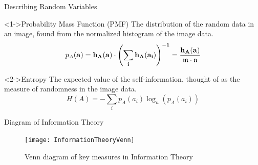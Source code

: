 \documentclass[serif]{beamer}
\begin{document}
\begin{frame}[c]{\sc Describing Random Variables}


\begin{block}<1->{Probability Mass Function (PMF)}
The distribution of the random data in an image, found from the normalized histogram of the image data.
\begin{equation}
\label{PMF}
	p_{A}(\bf{a})=h_{A}(\bf{a}) \cdot \left(\sum_{i}{h_{A}(a_{i})} \right)^{-1} = \frac{h_{A}(\bf{a})}{\mathfrak{m}\cdot\mathfrak{n}}
\end{equation}
\end{block}

\vfill

\begin{block}<2->{Entropy}
The expected value of the self-information, thought of as the measure of randomness in the image data.
\begin{equation}
\label{entropy}
	H(A) = - \sum_{i}{p_{A}(a_{i}) \log_{n}{\left(p_{A}(a_{i})\right)}}
\end{equation}
\end{block}

\end{frame}



\begin{frame}[c]{\sc Diagram of Information Theory}

\begin{figure}
\centering
\texttt{[image: InformationTheoryVenn]}
\caption{Venn diagram of key measures in Information Theory}
\label{infoTheory3}
\end{figure}

\end{frame}
\end{document}
